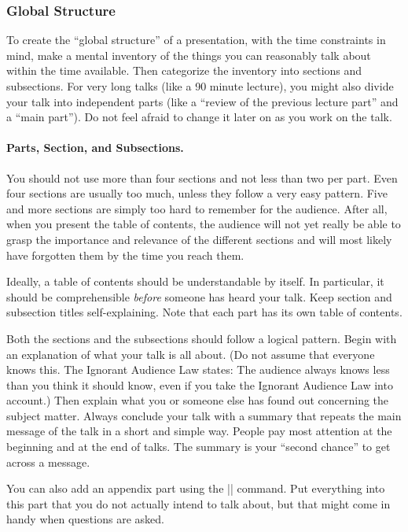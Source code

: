 \subsubsection{Global Structure}

To create the ``global structure'' of a presentation, with the time
constraints in mind, make a mental inventory of the 
things you can reasonably talk about within the time available. Then
categorize the inventory into sections and subsections. For very long
talks (like a 90 minute lecture), you might also divide your talk into
independent parts (like a ``review of the previous lecture part'' and
a ``main part'').  Do not feel afraid to change it later on as you
work on the talk.  



\paragraph{Parts, Section, and Subsections.}

You should not use more than four sections and not less than two per
part. Even four sections are usually too much, unless they follow 
a very easy pattern. Five and more sections are simply too hard to
remember for the audience. After all, when you present the table of
contents, the audience will not yet really be able to grasp the
importance and relevance of the different sections and will most
likely have forgotten them by the time you reach them.

Ideally, a table of contents should be understandable by itself. In
particular, it should be comprehensible \emph{before} someone has
heard your talk. Keep section and subsection titles
self-explaining. Note that each part has its own table of contents. 

Both the sections and the subsections should follow a logical
pattern. Begin with an explanation of what your talk is all about. (Do
not assume that everyone knows this. The Ignorant Audience Law states:
The audience always knows less than you think it should know, even if
you take the Ignorant Audience Law into account.) Then explain what
you or someone else has found out concerning the subject
matter. Always conclude your talk with a summary that repeats the main
message of the talk in a short and simple way. People pay most
attention at the beginning and at the end of talks. The summary is
your ``second chance'' to get across a message.

You can also add an appendix part using the |\appendix| command. Put
everything into this part that you do not actually intend to talk
about, but that might come in handy when questions are asked.



